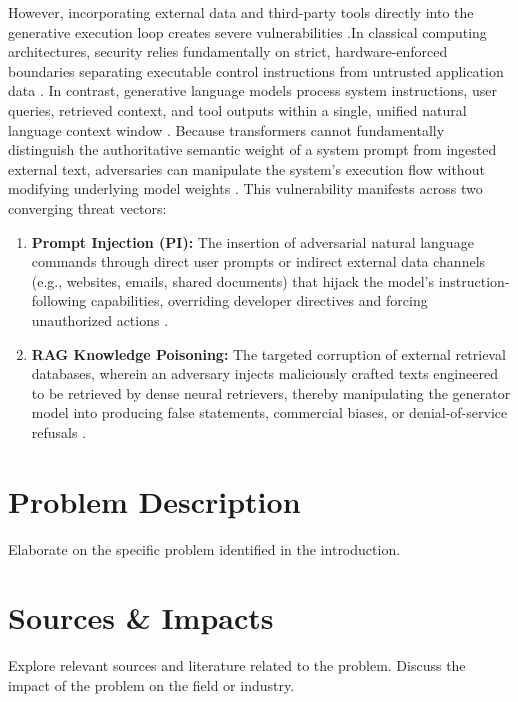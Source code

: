 However, incorporating external data and third-party tools directly into 
the generative execution loop creates severe vulnerabilities
\citet{correia_systematic_2026}.In classical computing architectures, 
security relies fundamentally on strict, hardware-enforced boundaries 
separating executable control instructions from untrusted application data
\citet{greshake_not_2023}. In contrast, generative language models process 
system instructions, user queries, retrieved context, and tool outputs 
within a single, unified natural language context window
\citet{liu_formalizing_2024}.
Because transformers cannot fundamentally distinguish the authoritative
semantic weight of a system prompt from ingested external text, adversaries 
can manipulate the system's execution flow without modifying underlying 
model weights \citet{liu_formalizing_2024}.
This vulnerability manifests across two converging threat vectors:
\begin{enumerate}
    \item 
    \textbf{Prompt Injection (PI):} The insertion of adversarial natural 
    language commands through direct user prompts or indirect external 
    data channels (e.g., websites, emails, shared documents) that hijack 
    the model's instruction-following capabilities, overriding developer 
    directives and forcing unauthorized actions 
    \citet{greshake_not_2023,liu_formalizing_2024}. 
    \item 
    \textbf{RAG Knowledge Poisoning:} The targeted corruption of external retrieval 
    databases, wherein an adversary injects maliciously crafted texts 
    engineered to be retrieved by dense neural retrievers, thereby 
    manipulating the generator model into producing false statements, 
    commercial biases, or denial-of-service refusals
    \citet{zou_poisonedrag_2025,zhang_benchmarking_2025}.

\end{enumerate}




\section{Problem Description}
Elaborate on the specific problem identified in the introduction.

\section{Sources \& Impacts}
Explore relevant sources and literature related to the problem.
Discuss the impact of the problem on the field or industry.


